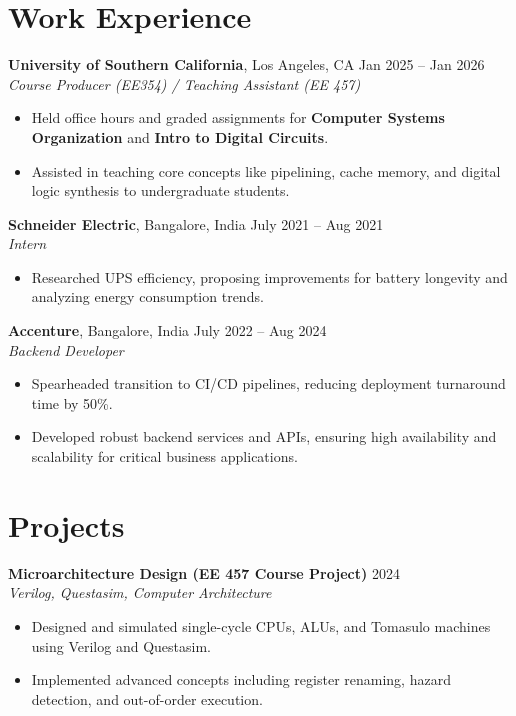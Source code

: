 \documentclass[letterpaper,10pt]{article}
\begin{document}
\section*{Work Experience}

\textbf{University of Southern California}, Los Angeles, CA \hfill Jan 2025 -- Jan 2026 \\
\textit{Course Producer (EE354) / Teaching Assistant (EE 457)}
\begin{itemize}[leftmargin=*,noitemsep,topsep=-2pt]
    \item Held office hours and graded assignments for \textbf{Computer Systems Organization} and \textbf{Intro to Digital Circuits}.
    \item Assisted in teaching core concepts like pipelining, cache memory, and digital logic synthesis to undergraduate students.
\end{itemize}

\textbf{Schneider Electric}, Bangalore, India \hfill July 2021 -- Aug 2021 \\
\textit{Intern}
\begin{itemize}[leftmargin=*,noitemsep,topsep=-2pt]
    \item Researched UPS efficiency, proposing improvements for battery longevity and analyzing energy consumption trends.
\end{itemize}

\textbf{Accenture}, Bangalore, India \hfill July 2022 -- Aug 2024 \\
\textit{Backend Developer}
\begin{itemize}[leftmargin=*,noitemsep,topsep=-2pt]
    \item Spearheaded transition to CI/CD pipelines, reducing deployment turnaround time by 50\%.
    \item Developed robust backend services and APIs, ensuring high availability and scalability for critical business applications.
\end{itemize}

\section*{Projects}

\textbf{Microarchitecture Design (EE 457 Course Project)} \hfill 2024 \\
\textit{Verilog, Questasim, Computer Architecture}
\begin{itemize}[leftmargin=*,noitemsep,topsep=-2pt]
    \item Designed and simulated single-cycle CPUs, ALUs, and Tomasulo machines using Verilog and Questasim.
    \item Implemented advanced concepts including register renaming, hazard detection, and out-of-order execution.
\end{itemize}
\end{document}
